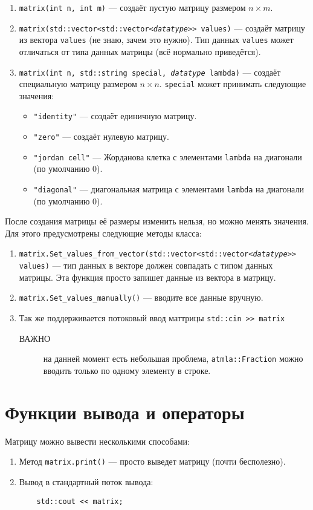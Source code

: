 \documentclass{article}
\begin{document}
\begin{enumerate}
    \item \texttt{matrix(int n, int m)} — создаёт пустую матрицу размером $n \times m$.
    \item \texttt{matrix(std::vector<std::vector<{\textit{datatype}}{>}> values)} — создаёт матрицу из вектора \texttt{values} (не знаю, зачем это нужно). Тип данных \texttt{values} может отличаться от типа данных матрицы (всё нормально приведётся).
    \item \texttt{matrix(int n, std::string special, \textit{datatype} lambda)} — создаёт специальную матрицу размером $n \times n$. \texttt{special} может принимать следующие значения:
    \begin{itemize}
        \item \texttt{"identity"} — создаёт единичную матрицу.
        \item \texttt{"zero"} — создаёт нулевую матрицу.
        \item \texttt{"jordan cell"} — Жорданова клетка с элементами \texttt{lambda} на диагонали (по умолчанию 0).
        \item \texttt{"diagonal"} — диагональная матрица с элементами \texttt{lambda} на диагонали (по умолчанию 0).
    \end{itemize}
\end{enumerate}

После создания матрицы её размеры изменить нельзя, но можно менять значения. Для этого предусмотрены следующие методы класса:

\begin{enumerate}
    \item \texttt{matrix.Set\_values\_from\_vector(std::vector<std::vector<{\textit{datatype}}{>}> values)} — тип данных в векторе должен совпадать с типом данных матрицы. Эта функция просто запишет данные из вектора в матрицу.
    \item \texttt{matrix.Set\_values\_manually()} — вводите все данные вручную.
    \item Так же поддерживается потоковый ввод маттрицы \texttt{std::cin {>}> matrix}
    \begin{description}
        \item[ВАЖНО] на данней момент есть небольшая проблема, \texttt{atmla::Fraction} можно вводить только по одному элементу в строке.
    \end{description} 
\end{enumerate}

\section{Функции вывода и операторы}
Матрицу можно вывести несколькими способами:
\begin{enumerate}
    \item Метод \texttt{matrix.print()} — просто выведет матрицу (почти бесполезно).
    \item Вывод в стандартный поток вывода:
    \begin{verbatim}
    std::cout << matrix;
    \end{verbatim}
\end{enumerate}
\end{document}
